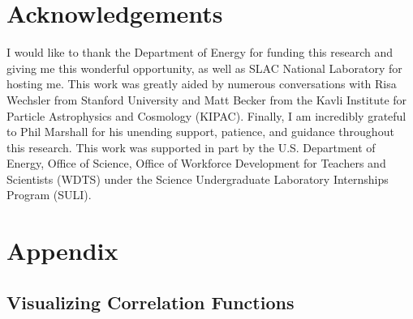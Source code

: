 \documentclass[%
 reprint,
 amsmath,amssymb,
 aps,nofootinbib
]{revtex4-1}
\begin{document}
\section{Acknowledgements}

I would like to thank the Department of Energy for funding this research and giving me this wonderful opportunity, as well as SLAC National Laboratory for hosting me. This work was greatly aided by numerous conversations with Risa Wechsler from Stanford University and Matt Becker from the Kavli Institute for Particle Astrophysics and Cosmology (KIPAC). Finally, I am incredibly grateful to Phil Marshall for his unending support, patience, and guidance throughout this research.
This work was supported in part by the U.S. Department of Energy, Office of Science, Office of Workforce Development for Teachers and Scientists (WDTS) under the Science Undergraduate Laboratory Internships Program (SULI).

\onecolumngrid

\section{Appendix}

\subsection*{Visualizing Correlation Functions}
\end{document}
